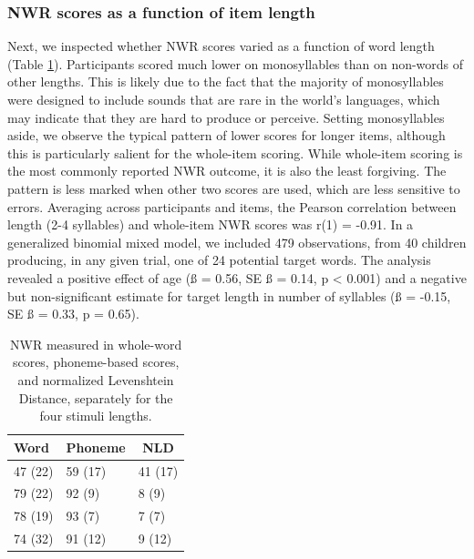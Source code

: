 \documentclass[english,,man,floatsintext]{apa6}
\begin{document}
\subsubsection{NWR scores as a function of item
length}\label{nwr-scores-as-a-function-of-item-length}

Next, we inspected whether NWR scores varied as a function of word
length (Table \ref{tab:tablength}). Participants scored much lower on
monosyllables than on non-words of other lengths. This is likely due to
the fact that the majority of monosyllables were designed to include
sounds that are rare in the world's languages, which may indicate that
they are hard to produce or perceive. Setting monosyllables aside, we
observe the typical pattern of lower scores for longer items, although
this is particularly salient for the whole-item scoring. While
whole-item scoring is the most commonly reported NWR outcome, it is also
the least forgiving. The pattern is less marked when other two scores
are used, which are less sensitive to errors. Averaging across
participants and items, the Pearson correlation between length (2-4
syllables) and whole-item NWR scores was r(1) = -0.91. In a generalized
binomial mixed model, we included 479 observations, from 40 children
producing, in any given trial, one of 24 potential target words. The
analysis revealed a positive effect of age (ß = 0.56, SE ß = 0.14, p
\textless{} 0.001) and a negative but non-significant estimate for
target length in number of syllables (ß = -0.15, SE ß = 0.33, p = 0.65).

\begin{table}[tbp]
\begin{center}
\begin{threeparttable}
\caption{\label{tab:tablength}NWR measured in whole-word scores, phoneme-based scores, and normalized Levenshtein Distance, separately for the four stimuli lengths.}
\begin{tabular}{lll}
\toprule
Word & \multicolumn{1}{c}{Phoneme} & \multicolumn{1}{c}{NLD}\\
\midrule
47 (22) & 59 (17) & 41 (17)\\
79 (22) & 92 (9) & 8 (9)\\
78 (19) & 93 (7) & 7 (7)\\
74 (32) & 91 (12) & 9 (12)\\
\bottomrule
\end{tabular}
\end{threeparttable}
\end{center}
\end{table}
\end{document}
